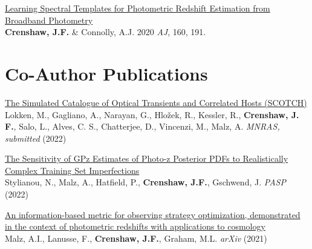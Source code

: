 \documentclass[margin, 11pt]{res}
\newcommand{\paper}[2]{\href{#1}{\sc #2}}
\begin{document}
\begin{resume}
\begin{etaremune}[leftmargin=0pt]

\item \paper{https://ui.adsabs.harvard.edu/abs/2020AJ....160..191C/abstract}{Learning Spectral Templates for Photometric Redshift Estimation from Broadband Photometry} \\
\textbf{Crenshaw, J.F.} \& Connolly, A.J. 2020 \textit{AJ}, 160, 191.

\end{etaremune}

\section{Co-Author Publications}

\begin{etaremune}[leftmargin=0pt]

\item \paper{https://ui.adsabs.harvard.edu/abs/2022arXiv220602815L/abstract}{The Simulated Catalogue of Optical Transients and Correlated Hosts (SCOTCH)} \\
Lokken, M., Gagliano, A., Narayan, G., Hložek, R., Kessler, R., \textbf{Crenshaw, J. F.}, Salo, L., Alves, C. S., Chatterjee, D., Vincenzi, M., Malz, A. \textit{MNRAS, submitted} (2022)

\item \paper{https://ui.adsabs.harvard.edu/abs/2022arXiv220212775S/abstract}{The Sensitivity of GPz Estimates of Photo-z Posterior PDFs to Realistically Complex Training Set Imperfections} \\
Stylianou, N., Malz, A., Hatfield, P., \textbf{Crenshaw, J.F.}, Gschwend, J. \textit{PASP} (2022)

\item \paper{https://arxiv.org/abs/2104.08229}{An information-based metric for observing strategy optimization, demonstrated in the context of photometric redshifts with applications to cosmology} \\
Malz, A.I., Lanusse, F., \textbf{Crenshaw, J.F.}, Graham, M.L. \textit{arXiv} (2021)

\end{etaremune}


\end{resume}
\end{document}
